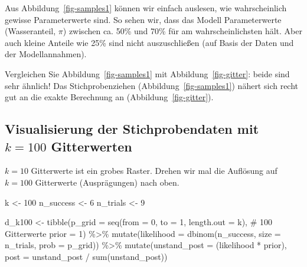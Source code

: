 \documentclass[
  a4paper,
  DIV=11]{scrreprt}
\newenvironment{Shaded}{\begin{snugshade}}{\end{snugshade}}
\newcommand{\AttributeTok}[1]{\textcolor[rgb]{0.40,0.45,0.13}{#1}}
\newcommand{\CommentTok}[1]{\textcolor[rgb]{0.37,0.37,0.37}{#1}}
\newcommand{\DecValTok}[1]{\textcolor[rgb]{0.68,0.00,0.00}{#1}}
\newcommand{\FunctionTok}[1]{\textcolor[rgb]{0.28,0.35,0.67}{#1}}
\newcommand{\NormalTok}[1]{\textcolor[rgb]{0.00,0.23,0.31}{#1}}
\newcommand{\OtherTok}[1]{\textcolor[rgb]{0.00,0.23,0.31}{#1}}
\newcommand{\SpecialCharTok}[1]{\textcolor[rgb]{0.37,0.37,0.37}{#1}}
\theoremstyle{definition}
\theoremstyle{remark}
\begin{document}
Aus Abbildung~\ref{fig-samples1} können wir einfach auslesen, wie
wahrscheinlich gewisse Parameterwerte sind. So sehen wir, dass das
Modell Parameterwerte (Wasseranteil, \(\pi\)) zwischen ca. 50\% und 70\%
für am wahrscheinlichsten hält. Aber auch kleine Anteile wie 25\% sind
nicht auszuschließen (auf Basis der Daten und der Modellannahmen).

Vergleichen Sie Abbildung~\ref{fig-samples1} mit
Abbildung~\ref{fig-gitter}: beide sind sehr ähnlich! Das
Stichprobenziehen (Abbildung~\ref{fig-samples1}) nähert sich recht gut
an die exakte Berechnung an (Abbildung~\ref{fig-gitter}).

\hypertarget{visualisierung-der-stichprobendaten-mit-k100-gitterwerten}{%
\subsection{\texorpdfstring{Visualisierung der Stichprobendaten mit
\(k=100\)
Gitterwerten}{Visualisierung der Stichprobendaten mit k=100 Gitterwerten}}\label{visualisierung-der-stichprobendaten-mit-k100-gitterwerten}}

\(k=10\) Gitterwerte ist ein grobes Raster. Drehen wir mal die Auflösung
auf \(k=100\) Gitterwerte (Ausprägungen) nach oben.

\begin{Shaded}
\begin{Highlighting}[]
\NormalTok{k }\OtherTok{\textless{}{-}} \DecValTok{100}
\NormalTok{n\_success }\OtherTok{\textless{}{-}} \DecValTok{6}
\NormalTok{n\_trials  }\OtherTok{\textless{}{-}} \DecValTok{9}

\NormalTok{d\_k100 }\OtherTok{\textless{}{-}}
  \FunctionTok{tibble}\NormalTok{(}\AttributeTok{p\_grid =} \FunctionTok{seq}\NormalTok{(}\AttributeTok{from =} \DecValTok{0}\NormalTok{, }
                      \AttributeTok{to =} \DecValTok{1}\NormalTok{, }
                      \AttributeTok{length.out =}\NormalTok{ k),  }\CommentTok{\# 100 Gitterwerte}
         \AttributeTok{prior  =} \DecValTok{1}\NormalTok{) }\SpecialCharTok{\%\textgreater{}\%} 
  \FunctionTok{mutate}\NormalTok{(}\AttributeTok{likelihood =} \FunctionTok{dbinom}\NormalTok{(n\_success, }
                             \AttributeTok{size =}\NormalTok{ n\_trials, }
                             \AttributeTok{prob =}\NormalTok{ p\_grid)) }\SpecialCharTok{\%\textgreater{}\%} 
  \FunctionTok{mutate}\NormalTok{(}\AttributeTok{unstand\_post =}\NormalTok{ (likelihood }\SpecialCharTok{*}\NormalTok{ prior),}
         \AttributeTok{post =}\NormalTok{ unstand\_post }\SpecialCharTok{/} \FunctionTok{sum}\NormalTok{(unstand\_post))}
\end{Highlighting}
\end{Shaded}
\end{document}
